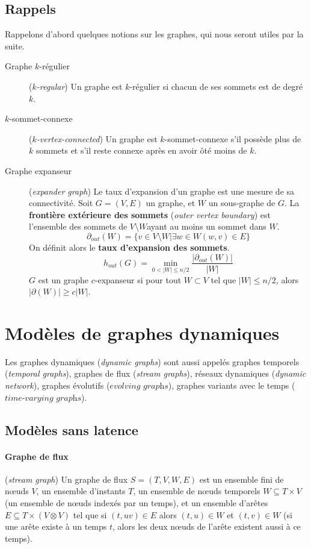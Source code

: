 \documentclass[12pt,a4paper]{article}
\begin{document}
\subsection{Rappels}
Rappelons d'abord quelques notions sur les graphes, qui nous seront
utiles par la suite.

\begin{description}
\item[Graphe \(k\)-régulier] (\textit{\(k\)-regular}) Un graphe est
  \(k\)-régulier si chacun de ses sommets est de degré \(k\).
\item[\(k\)-sommet-connexe] (\textit{\(k\)-vertex-connected}) Un
  graphe est \(k\)-sommet-connexe s'il possède plus de \(k\) sommets
  et s'il reste connexe après en avoir ôté moins de \(k\).
\item[Graphe expanseur] (\textit{expander graph}) Le taux d'expansion
  d'un graphe est une mesure de sa connectivité. Soit \(G = (V, E)\)
  un graphe, et \(W\) un sous-graphe de \(G\). La \textbf{frontière
    extérieure des sommets} (\textit{outer vertex boundary}) est
  l'ensemble des sommets de \(V \setminus W\)ayant au moins un sommet
  dans \(W\).
  \[\partial_{out}(W) = \{v \in V \setminus W | \exists w \in W (w, v)
    \in E\}\]
  On définit alors le \textbf{taux d'expansion des sommets}.
  \[h_{out}(G) = \min_{0 < |W| \leq n/2}\frac{|\partial_{out}(W)|}{|W|}\]
  \(G\) est un graphe \(c\)-expanseur si pour tout \(W \subset V\) tel
  que \(|W| \leq n / 2\), alors \(|\partial(W)| \geq c |W|\).
\end{description}

\section{Modèles de graphes dynamiques}

Les graphes dynamiques (\textit{dynamic graphs}) sont aussi appelés
graphes temporels (\textit{temporal graphs}), graphes de flux
(\textit{stream graphs}), réseaux dynamiques (\textit{dynamic
  network}), graphes évolutifs (\(\textit{evolving graphs}\)),
graphes variants avec le temps (\(\textit{time-varying graphs}\)).

\subsection{Modèles sans latence}

\paragraph{Graphe de flux}\cite{latapy2017stream} (\textit{stream
  graph}) Un graphe de flux \(S = (T, V, W, E)\) est un ensemble fini
de nœuds \(V\), un ensemble d'instants \(T\), un ensemble de nœuds
temporels \(W \subseteq T \times V\) (un ensemble de nœuds indexés par
un temps), et un ensemble d'arêtes
\(E \subseteq T \times (V \otimes V)\) tel que si \((t, uv) \in E\)
alors \((t, u) \in W\) et \((t, v) \in W\) (si une arête existe à un
temps \(t\), alors les deux nœuds de l'arête existent aussi à ce
temps).
\end{document}
